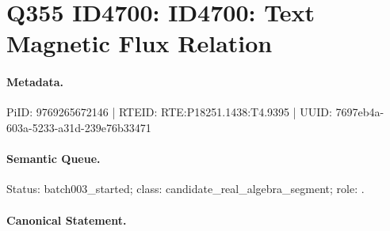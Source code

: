 \section*{Q355 ID4700: ID4700: Text Magnetic Flux Relation}
\paragraph{Metadata.}
PiID: 9769265672146 | RTEID: RTE:P18251.1438:T4.9395 | UUID: 7697eb4a-603a-5233-a31d-239e76b33471

\paragraph{Semantic Queue.}
Status: batch003\_started; class: candidate\_real\_algebra\_segment; role: .

\paragraph{Canonical Statement.}
